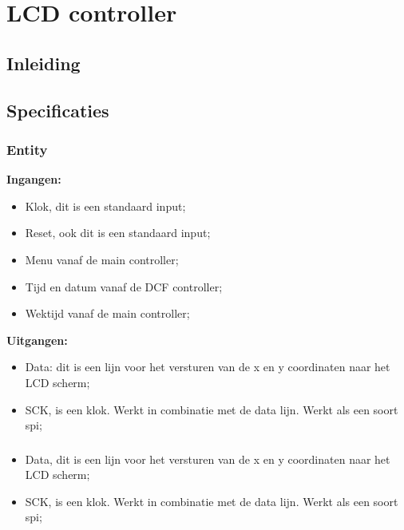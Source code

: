 \chapter{LCD controller}
\section{Inleiding}

\section{Specificaties}

\subsection{Entity}
\textbf{Ingangen:}

\begin{itemize}
\item Klok, dit is een standaard input;
\item Reset, ook dit is een standaard input;
\item Menu vanaf de main controller;
\item Tijd en datum vanaf de DCF controller;
\item Wektijd vanaf de main controller;
\end{itemize}

\textbf{Uitgangen:}
\begin{itemize}
\item Data: dit is een lijn voor het versturen van de x en y coordinaten naar het LCD scherm;
\item SCK, is een klok. Werkt in combinatie met de data lijn. Werkt als een soort spi;
\end{itemize}

\subsection{}
\begin{itemize}
\item Data, dit is een lijn voor het versturen van de x en y coordinaten naar het LCD scherm;
\item SCK, is een klok. Werkt in combinatie met de data lijn. Werkt als een soort spi;
\end{itemize}




